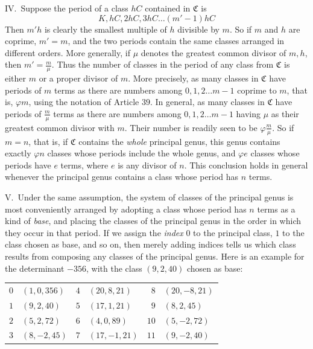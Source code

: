 IV.\ Suppose the period of a class \(hC\) contained in \(\mathfrak C\) is
\[K,hC,2hC,3hC\ldots(m'-1)hC\]
Then \(m'h\) is clearly the smallest multiple of \(h\) divisible by \(m\). So if \(m\) and \(h\) are coprime, \(m'=m\), and the two periods contain the same classes arranged in different orders. More generally, if \(\mu\) denotes the greatest common divisor of \(m,h\), then \(m'=\frac m\mu\). Thus the number of classes in the period of any class from \(\mathfrak C\) is either \(m\) or a proper divisor of \(m\). More precisely, as many classes in \(\mathfrak C\) have periods of \(m\) terms as there are numbers among \(0,1,2\ldots m-1\) coprime to \(m\), that is, \(\varphi m\), using the notation of Article \(39\). In general, as many classes in \(\mathfrak C\) have periods of \(\frac m\mu\) terms as there are numbers among \(0,1,2\ldots m-1\) having \(\mu\) as their greatest common divisor with \(m\). Their number is readily seen to be \(\varphi\frac m\mu\). So if \(m=n\), that is, if \(\mathfrak C\) contains the \textit{whole} principal genus, this genus contains exactly \(\varphi n\) classes whose periods include the whole genus, and \(\varphi e\) classes whose periods have \(e\) terms, where \(e\) is any divisor of \(n\). This conclusion holds in general whenever the principal genus contains a class whose period has \(n\) terms.

V.\ Under the same assumption, the system of classes of the principal genus is most conveniently arranged by adopting a class whose period has \(n\) terms as a kind of \textit{base}, and placing the classes of the principal genus in the order in which they occur in that period. If we assign the \textit{index} \(0\) to the principal class, \(1\) to the class chosen as base, and so on, then merely adding indices tells us which class results from composing any classes of the principal genus. Here is an example for the determinant \(-356\), with the class \((9,2,40)\) chosen as base:
\begin{center}\begin{tabular}{rl|rl|rl}
\(0\) & \((1,0,356)\) & \(4\) & \((20,8,21)\) & \(8\) & \((20,-8,21)\)\\[2pt]
\(1\) & \((9,2,40)\) & \(5\) & \((17,1,21)\) & \(9\) & \((8,2,45)\)\\[2pt]
\(2\) & \((5,2,72)\) & \(6\) & \((4,0,89)\) & \(10\) & \((5,-2,72)\)\\[2pt]
\(3\) & \((8,-2,45)\) & \(7\) & \((17,-1,21)\) & \(11\) & \((9,-2,40)\)\\[2pt]
\end{tabular}\end{center}

